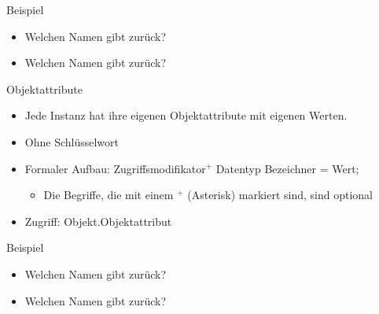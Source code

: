 \documentclass{../tuda-beamer}
\begin{document}
  \begin{frame}[c]{Beispiel}
    
  \end{frame}

  \begin{frame}[c]
    \begin{itemize}
      \item Welchen Namen gibt  zurück?
      \item Welchen Namen gibt  zurück?
    \end{itemize}

    
  \end{frame}

  \begin{frame}{Objektattribute}
    \begin{itemize}
      \item Jede Instanz hat ihre eigenen Objektattribute mit eigenen Werten.
      \item Ohne Schlüsselwort 
      \item Formaler Aufbau: Zugriffsmodifikator\(^+\) Datentyp Bezeichner =
      Wert;
      \begin{itemize}
        \item Die Begriffe, die mit einem \(^+\) (Asterisk) markiert sind, sind optional
      \end{itemize}
      \item Zugriff: Objekt.Objektattribut
    \end{itemize}
  \end{frame}

  \begin{frame}[c]{Beispiel}
    
  \end{frame}

  \begin{frame}[c]
    \begin{itemize}
      \item Welchen Namen gibt  zurück?
      \item Welchen Namen gibt  zurück?
    \end{itemize}

    
  \end{frame}
\end{document}
